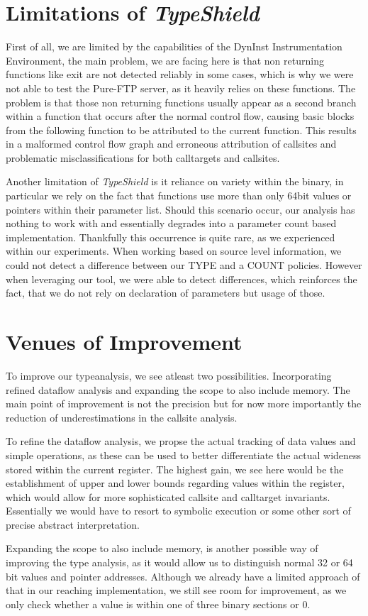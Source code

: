 \section{Limitations of \textit{TypeShield}}
\label{section:limit}
First of all, we are limited by the capabilities of the DynInst Instrumentation Environment, the main problem, we are facing here is that non returning functions like exit are not detected reliably in some cases, which is why we were not able to test the Pure-FTP server, as it heavily relies on these functions. The problem is that those non returning functions usually appear as a second branch within a function that occurs after the normal control flow, causing basic blocks from the following function to be attributed to the current function. This results in a malformed control flow graph and erroneous attribution of callsites and problematic misclassifications for both calltargets and callsites.

Another limitation of \textit{TypeShield} is it reliance on variety within the binary, in particular we rely on the fact that functions use more than only 64bit values or pointers within their parameter list. Should this scenario occur, our analysis has nothing to work with and essentially degrades into a parameter count based implementation. Thankfully this occurrence is quite rare, as we experienced within our experiments. When working based on source level information, we could not detect a difference between our TYPE and a COUNT policies. However when leveraging our tool, we were able to detect differences, which reinforces the fact, that we do not rely on declaration of parameters but usage of those.



\section{Venues of Improvement}
\label{section:venuesimp}

To improve our typeanalysis, we see atleast two possibilities. Incorporating refined dataflow analysis and expanding the scope to also include memory. The main point of improvement is not the precision but for now more importantly the reduction of underestimations in the callsite analysis.

To refine the dataflow analysis, we propse the actual tracking of data values and simple operations, as these can be used to better differentiate the actual wideness stored within the current register. The highest gain, we see here would be the establishment of upper and lower bounds regarding values within the register, which would allow for more sophisticated callsite and calltarget invariants. Essentially we would have to resort to symbolic execution or some other sort of precise abstract interpretation.

Expanding the scope to also include memory, is another possible way of improving the type analysis, as it would allow us to distinguish normal 32 or 64 bit values and pointer addresses. Although we already have a limited approach of that in our reaching implementation, we still see room for improvement, as we only check whether a value is within one of three binary sections or 0.
